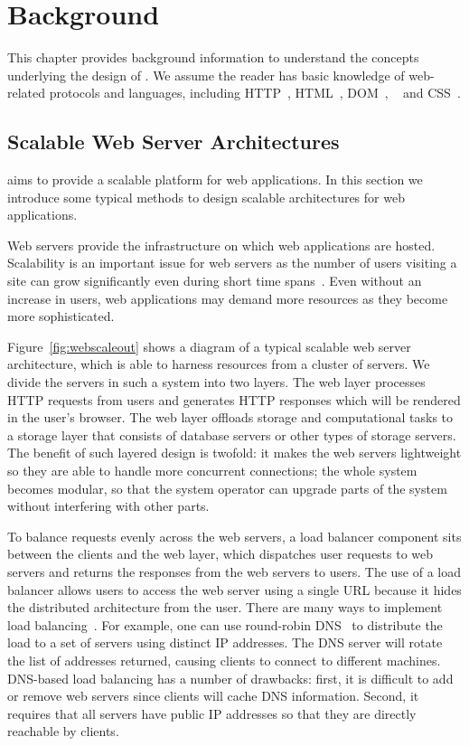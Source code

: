 \chapter{Background}

This chapter provides background information to understand the concepts
underlying the design of \cbtwo. We assume the reader has basic knowledge of
web-related protocols and languages, including HTTP~\cite{rfc7231},
HTML~\cite{hickson2012html},  DOM~\cite{wilson2000document},
\js~\cite{ecmascript2011ecmascript} and CSS~\cite{css21}.

\webscaleoutfig{}

\section{Scalable Web Server Architectures}
\label{sec:websys}

\cbtwo aims to provide a scalable platform for web applications.
In this section we introduce some typical methods to design
scalable architectures for web applications.

Web servers provide the infrastructure on which web applications 
are hosted.
Scalability is an important issue for web servers as the number of users
visiting a site can grow significantly even during short time spans~\cite{berners1998world}.
Even without an increase in users,
web applications may demand more resources as they become more sophisticated.

Figure~\ref{fig:webscaleout} shows a diagram of a typical scalable web server
architecture, which is able to harness resources from a cluster of servers. We
divide the servers in such a system into two layers. The web layer
processes HTTP requests from users and generates HTTP responses which will be
rendered in the user's browser. The web layer offloads storage and
computational tasks to a storage layer that consists of database servers or
other types of storage servers. The benefit of such layered design is twofold:
it makes the web servers lightweight so they are able to handle more
concurrent connections; the whole system becomes modular, so that the system
operator can upgrade parts of the system without interfering with other parts.

To balance requests evenly across the web servers, a load balancer component
sits between the clients and the web layer, which dispatches user requests to
web servers and returns the responses from the web servers to users. The use
of a load balancer allows users to access the web server using a single URL
because it hides the distributed architecture from the user. There are many
ways to implement load balancing~\cite{cardellini2002state}. For example, one can 
use round-robin DNS~\cite{} to distribute the load to a set of servers using 
distinct IP addresses.  The DNS server will rotate the list of addresses
returned, causing clients to connect to different machines.
%
DNS-based load balancing has a number of drawbacks:  
first, it is difficult to add or remove web servers since clients will
cache DNS information.  Second, it requires that all servers have public 
IP addresses so that they are directly reachable by clients.  

